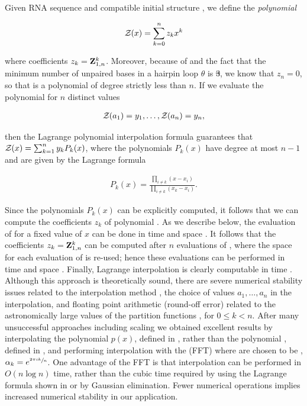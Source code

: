 \documentclass[11pt, oneside]{Thesis} %
\providecommand{\DIFadd}[1]{{\protect\color{blue}\uwave{#1}}} %
\providecommand{\DIFdel}[1]{{\protect\color{red}\sout{#1}}}                      %
\providecommand{\DIFaddbegin}{} %
\providecommand{\DIFaddend}{} %
\providecommand{\DIFdelbegin}{} %
\providecommand{\DIFdelend}{} %
\begin{document}
Given RNA sequence \seq and compatible initial structure \strSt,
we define the {\em polynomial}

\begin{align}
\label{eq:fftbor:zOfX}
\fullZx = \sum_{k=0}^n z_k x^k
\end{align}

where coefficients $z_k={\bf Z}^{k}_{1,n}$. Moreover, because of
 and the fact that the minimum number of
unpaired bases in a hairpin loop $\theta$ is \DIFdelbegin \DIFdel{3}\DIFdelend \DIFaddbegin \DIFadd{$3$}\DIFaddend , we know that $z_n=0$,
so that \fullZx is a polynomial of degree strictly less than $n$.
If we evaluate the polynomial \fullZx for $n$ distinct values

\begin{align}
\label{eq:fftbor:solutionsForAlpha}
\emZof{}{a_1} = y_1, \dots, \emZof{}{a_n} = y_n,
\end{align}

then the Lagrange polynomial interpolation formula guarantees that
${\mathcal Z}_{}(x) = \sum_{k=1}^n y_k P_k(x)$, where the polynomials $P_k(x)$ have degree
at most $n-1$ and are given by the Lagrange formula

\begin{align}
\label{eq:fftbor:lagrangeInterpolation}
P_k(x) = \frac{\prod_{i\ne k} (x-x_i)}{\prod_{i \ne k} (x_k-x_i)}.
\end{align}

Since the polynomials $P_k(x)$ can be explicitly computed, it follows that
we can compute the coefficients $z_k$ of polynomial \fullZx. As we describe
below, the evaluation of \fullZx for a fixed value of $x$ can be done in
time  and space .  It follows that the coefficients
$z_k={\bf Z}^{k}_{1,n}$ can be computed after
$n$ evaluations of \fullZx, where the space for each evaluation of \fullZx
is re-used; hence these evaluations can be performed in time  and space
. Finally,
Lagrange interpolation is clearly computable in time .
Although this approach is theoretically sound, there are severe
numerical stability issues related to the interpolation method
\citep{highambarycentricinterpolation},
the choice of values $a_1,\dots,a_{n}$ in the interpolation,
and floating point arithmetic (round-off error) related to the
astronomically large values of the partition functions
, for $0 \leq k < n$. After many unsuccessful
approaches including scaling we obtained excellent results by
interpolating the polynomial $p(x)$, defined in ,
rather than the polynomial \fullZx, defined in ,
and performing interpolation with the \fft (FFT) \citep{cormen}
where \alphaN are
chosen to be \nRoUs,
$\alpha_k = e^{\sfrac{2 \pi i k}{n}}$.
One
advantage of the FFT is that interpolation can be performed in $O(n \log n)$
time, rather than the cubic time required by using the Lagrange formula
shown in  or by Gaussian elimination. Fewer
numerical operations implies increased numerical stability in our application.
\end{document}
